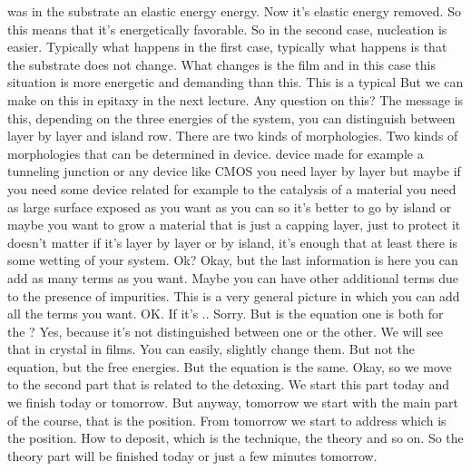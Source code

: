 was in the substrate an elastic energy energy. Now it's elastic energy removed. So this means that it's energetically favorable. So in the second case, nucleation is easier. Typically what happens in the first case, typically what happens is that the substrate does not change. What changes is the film and in this case this situation is more energetic and demanding than this. This is a typical But we can make on this in epitaxy in the next lecture. Any question on this? The message is this, depending on the three energies of the system, you can distinguish between layer by layer and island row. There are two kinds of morphologies. Two kinds of morphologies that can be determined in device. device made for example a tunneling junction or any device like CMOS you need layer by layer but maybe if you need some device related for example to the catalysis of a material you need as large surface exposed as you want as you can so it's better to go by island or maybe you want to grow a material that is just a capping layer, just to protect it doesn't matter if it's layer by layer or by island, it's enough that at least there is some wetting of your system. Ok? Okay, but the last information is here you can add as many terms as you want. Maybe you can have other additional terms due to the presence of impurities. This is a very general picture in which you can add all the terms you want. OK. If it's .. Sorry. But is the equation one is both for the ? Yes, because it's not distinguished between one or the other. We will see that in crystal in films. You can easily, slightly change them. But not the equation, but the free energies. But the equation is the same. Okay, so we move to the second part that is related to the detoxing. We start this part today and we finish today or tomorrow. But anyway, tomorrow we start with the main part of the course, that is the position. From tomorrow we start to address which is the position. How to deposit, which is the technique, the theory and so on. So the theory part will be finished today or just a few minutes tomorrow.

